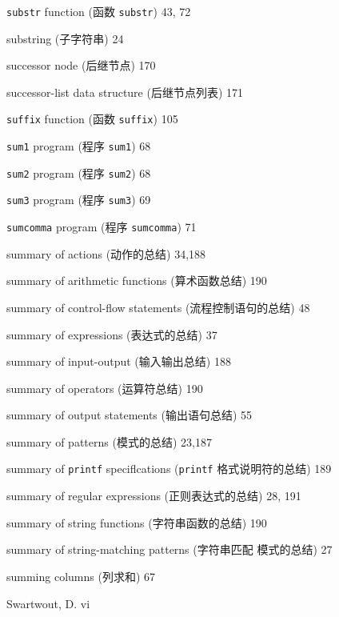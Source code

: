 \begin{multicols}{2}
\hangindent=2pc  \verb'substr' function (函数 \verb'substr') 43, 72

\hangindent=2pc  substring (子字符串) 24

\hangindent=2pc  successor node (后继节点) 170

\hangindent=2pc  successor-list data structure (后继节点列表) 171

\hangindent=2pc  \verb'suffix' function (函数 \verb'suffix') 105

\hangindent=2pc  \verb'sum1' program (程序 \verb'sum1') 68

\hangindent=2pc  \verb'sum2' program (程序 \verb'sum2') 68

\hangindent=2pc  \verb'sum3' program (程序 \verb'sum3') 69

\hangindent=2pc  \verb'sumcomma' program (程序 \verb'sumcomma') 71

\hangindent=2pc  summary of actions (动作的总结) 34,188

\hangindent=2pc  summary of arithmetic functions (算术函数总结) 190

\hangindent=2pc  summary of control-flow statements
(流程控制语句的总结) 48

\hangindent=2pc  summary of expressions (表达式的总结) 37

\hangindent=2pc  summary of input-output (输入输出总结) 188

\hangindent=2pc  summary of operators (运算符总结) 190

\hangindent=2pc  summary of output statements (输出语句总结) 55

\hangindent=2pc  summary of patterns (模式的总结) 23,187

\hangindent=2pc  summary of \verb'printf' speciflcations
(\verb'printf' 格式说明符的总结) 189

\hangindent=2pc  summary of regular expressions (正则表达式的总结)
28, 191

\hangindent=2pc  summary of string functions (字符串函数的总结) 190

\hangindent=2pc  summary of string-matching patterns (字符串匹配 
模式的总结) 27

\hangindent=2pc  summing columns (列求和) 67

\hangindent=2pc  Swartwout, D. vi


\end{multicols}
